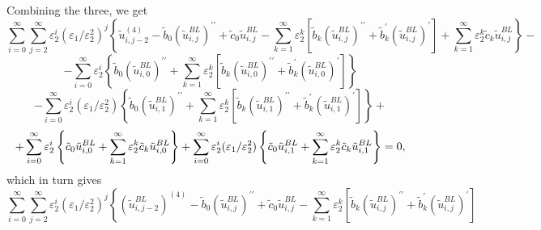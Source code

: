 \documentclass[12pt]{article}
\begin{document}
%
Combining the three, we get
%
\begin{equation*}
\sum_{i=0}^{\infty }\sum_{j=2}^{\infty }\varepsilon _{2}^{i}(\varepsilon
_{1}/\varepsilon _{2}^{2})^{j}\left\{ \tilde{u}_{i,j-2}^{(4)}-\tilde{b}_{0}%
\left(\tilde{u}^{BL}_{i,j}\right)^{\prime \prime }+\tilde{c}_{0}\tilde{u}^{BL}%
_{i,j}-\sum_{k=1}^{\infty }\varepsilon _{2}^{k}\left[ \tilde{b}_{k}\left(\tilde{u}^{BL}%
_{i,j}\right)^{\prime \prime }+\tilde{b}_{k}^{\prime }\left(\tilde{u}^{BL}_{i,j}\right)^{\prime }%
\right] +\sum_{k=1}^{\infty }\varepsilon _{2}^{k}\tilde{c}_{k}\tilde{u}^{BL}%
_{i,j}\right\} -
\end{equation*}
%
\begin{equation*}
-\sum_{i=0}^{\infty }\varepsilon _{2}^{i}\left\{ \tilde{b}_{0}\left(\tilde{u}^{BL}%
_{i,0}\right)^{\prime \prime }+\sum_{k=1}^{\infty }\varepsilon _{2}^{k}\left[ 
\tilde{b}_{k}\left(\tilde{u}^{BL}_{i,0}\right)^{\prime \prime }+\tilde{b}_{k}^{\prime }%
\left(\tilde{u}^{BL}_{i,0}\right)^{\prime }\right] \right\} 
\end{equation*}
%
\begin{equation*}
-\sum_{i=0}^{\infty }\varepsilon
_{2}^{i}(\varepsilon _{1}/\varepsilon _{2}^{2})\left\{ \tilde{b}_{0}\left(\tilde{u}^{BL}%
_{i,1}\right)^{\prime \prime }+\sum_{k=1}^{\infty }\varepsilon _{2}^{k}\left[ 
\tilde{b}_{k}\left(\tilde{u}^{BL}_{i,1}\right)^{\prime \prime }+\tilde{b}_{k}^{\prime }%
\left(\tilde{u}^{BL}_{i,1}\right)^{\prime }\right] \right\} +
\end{equation*}
%
\begin{equation*}
+\sum_{i=0}^{\infty }\varepsilon _{2}^{i}\left\{ \tilde{c}_{0}\tilde{u}^{BL}%
_{i,0}+\sum_{k=1}^{\infty }\varepsilon _{2}^{k}\tilde{c}_{k}\tilde{u}^{BL}%
_{i,0}\right\} +\sum_{i=0}^{\infty }\varepsilon _{2}^{i}(\varepsilon
_{1}/\varepsilon _{2}^{2})\left\{ \tilde{c}_{0}\tilde{u}^{BL}_{i,1}+\sum_{k=1}^{%
\infty }\varepsilon _{2}^{k}\tilde{c}_{k}\tilde{u}^{BL}_{i,1}\right\} =0,
\end{equation*}
%
which in turn gives
%
\begin{equation*}
\sum_{i=0}^{\infty }\sum_{j=2}^{\infty }\varepsilon _{2}^{i}(\varepsilon
_{1}/\varepsilon _{2}^{2})^{j}\left\{ \left(\tilde{u}^{BL}_{i,j-2}\right)^{(4)}-\tilde{b}_{0}%
\left(\tilde{u}^{BL}_{i,j}\right)^{\prime \prime }+\tilde{c}_{0}\tilde{u}^{BL}%
_{i,j}-\sum_{k=1}^{\infty }\varepsilon _{2}^{k}\left[ \tilde{b}_{k}\left(\tilde{u}^{BL}%
_{i,j}\right)^{\prime \prime}+\tilde{b}_{k}^{\prime }\left(\tilde{u}^{BL}_{i,j}\right)^{\prime }%
\right] \right. 
\end{equation*}
\end{document}

